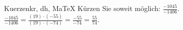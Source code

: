 \begin{MAufgabe}{Kuerzen}{kr, dh, MaTeX}
K\"urzen Sie soweit m\"oglich: $\frac{-1045}{-1406}$.\\ 
\ifLsg\MLoesung
\quad $\frac{-1045}{-1406}=\frac{(19)\cdot(-55)}{(19)\cdot(-74)}=\frac{-55}{-74}=\frac{55}{74}$.\else\relax\fi
 \end{MAufgabe}
